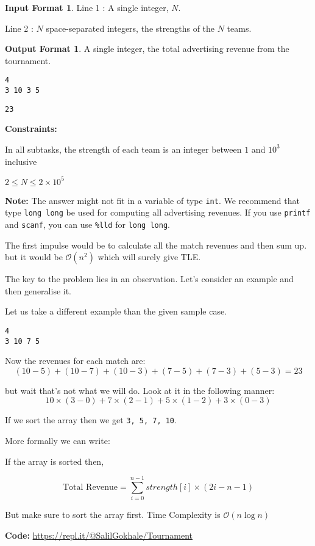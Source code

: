 \documentclass[twoside,12pt,a4paper,english]{book}
\theoremstyle{definition}
\theoremstyle{problemstyle}
\theoremstyle{problemstyle}
\newtheorem*{input_st}{Input Format} %
\theoremstyle{problemstyle}
\newtheorem*{output_st}{Output Format} %
\begin{document}
\begin{input_st}

Line 1 : A single integer, $N$.

Line 2 : $N$ space-separated integers, the strengths of the $N$ teams.

\end{input_st}

\begin{output_st}

A single integer, the total advertising revenue from the tournament.

\end{output_st}

\begin{tcolorbox}[title=Example]
\begin{lstlisting}
4
3 10 3 5
\end{lstlisting}
\tcblower
\begin{lstlisting}
23
\end{lstlisting}
\end{tcolorbox}

\textbf{Constraints:}
\begin{center}
    In all subtasks, the strength of each team is an integer between $1$ and $10^3$ inclusive
    
    $2 \leq N \leq 2\times 10^5$
\end{center}

\textbf{Note:} The answer might not fit in a variable of type \texttt{int}. We recommend that type \texttt{long long} be used for computing all advertising revenues. If you use \texttt{printf} and \texttt{scanf}, you can use \texttt{\%lld} for \texttt{long long}.

\begin{tcolorbox}[title=Solution]

The first impulse would be to calculate all the match revenues and then sum up. but it would be $\mathcal{O}(n^2)$ which will surely give TLE.

The key to the problem lies in an observation. Let’s consider an example and then generalise it.

Let us take a different example than the given sample case.
\begin{lstlisting}
4
3 10 7 5
\end{lstlisting}
Now the revenues for each match are: 
$$(10-5) +(10-7) + (10-3) + (7-5) + (7-3) + (5-3) = 23$$

but wait that’s not what we will do. Look at it in the following manner:
$$10\times (3-0) + 7\times (2-1) + 5\times (1-2) + 3\times (0-3)$$

If we sort the array then we get \texttt{3, 5, 7, 10}.

More formally we can write:

If the array is sorted then,

$$\text{Total Revenue} = \sum_{i=0}^{n-1}strength[i] \times (2i-n-1)$$

But make sure to sort the array first. Time Complexity is $\mathcal{O}(n\log{n})$

\textbf{Code: } \url{https://repl.it/@SalilGokhale/Tournament}

\end{tcolorbox}
\end{document}
